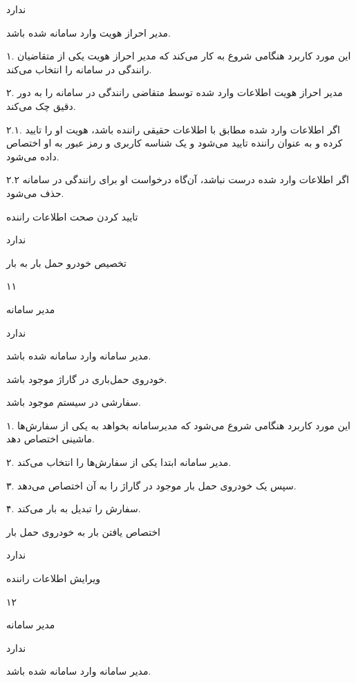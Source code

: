 ندارد

مدیر احراز هویت وارد سامانه شده باشد.


۱. این مورد کاربرد هنگامی شروع به کار می‌کند که مدیر احراز هویت یکی از متقاضیان رانندگی در سامانه را انتخاب می‌کند.

۲. مدیر احراز هویت اطلاعات وارد شده توسط متقاضی رانندگی در سامانه را به دور دقیق چک می‌کند.

۲.۱. اگر اطلاعات وارد شده مطابق با اطلاعات حقیقی راننده باشد، هویت او را تایید کرده و به عنوان راننده تایید می‌شود و یک شناسه کاربری و رمز عبور به او اختصاص داده می‌شود.

۲.۲ اگر اطلاعات وارد شده درست نباشد، آن‌گاه درخواست او برای رانندگی در سامانه حذف می‌شود.

تایید کردن صحت اطلاعات راننده

ندارد

\newpage

تخصیص خودرو حمل بار به بار

۱۱

مدیر سامانه

ندارد


مدیر سامانه وارد سامانه شده باشد. 

خودروی حمل‌باری در گاراژ موجود باشد.

سفارشی در سیستم موجود باشد.


۱. این مورد کاربرد هنگامی شروع می‌شود که مدیرسامانه بخواهد به یکی از سفارش‌ها ماشینی اختصاص دهد.

۲. مدیر سامانه ابتدا یکی از سفارش‌ها را انتخاب می‌کند.

۳. سپس یک خودروی حمل بار موجود در گاراژ را به آن اختصاص می‌دهد.

۴. سفارش را تبدیل به بار می‌کند.

اختصاص یافتن بار به خودروی حمل بار

ندارد

\newpage

ویرایش اطلاعات راننده

۱۲

مدیر سامانه

ندارد

مدیر سامانه وارد سامانه شده باشد.

